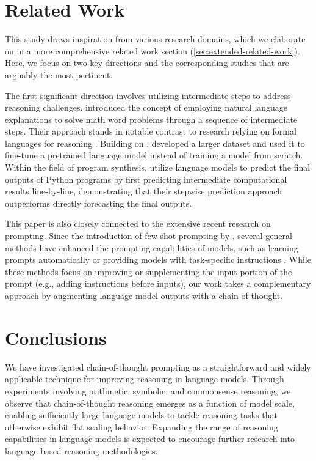 \section{Related Work} This study draws inspiration from various research domains, which we elaborate on in a more comprehensive related work section (\cref{sec:extended-related-work}). Here, we focus on two key directions and the corresponding studies that are arguably the most pertinent.

The first significant direction involves utilizing intermediate steps to address reasoning challenges. \cite{ling-etal-2017-program} introduced the concept of employing natural language explanations to solve math word problems through a sequence of intermediate steps. Their approach stands in notable contrast to research relying on formal languages for reasoning \citep{roy-2016-reasoning, chiang-chen-2019-semantically, amini-etal-2019-mathqa, chen2019neural}. Building on \citet{ling-etal-2017-program}, \citet{cobbe2021training} developed a larger dataset and used it to fine-tune a pretrained language model instead of training a model from scratch. Within the field of program synthesis, \cite{nye2021show} utilize language models to predict the final outputs of Python programs by first predicting intermediate computational results line-by-line, demonstrating that their stepwise prediction approach outperforms directly forecasting the final outputs.

This paper is also closely connected to the extensive recent research on prompting. Since the introduction of few-shot prompting by \citet{brown2020language}, several general methods have enhanced the prompting capabilities of models, such as learning prompts automatically \citep{lester-etal-2021-power} or providing models with task-specific instructions \citep{wei2021finetuned,sanh2021multitask,ouyang2022training}. While these methods focus on improving or supplementing the input portion of the prompt (e.g., adding instructions before inputs), our work takes a complementary approach by augmenting language model outputs with a chain of thought.

\section{Conclusions} We have investigated chain-of-thought prompting as a straightforward and widely applicable technique for improving reasoning in language models. Through experiments involving arithmetic, symbolic, and commonsense reasoning, we observe that chain-of-thought reasoning emerges as a function of model scale, enabling sufficiently large language models to tackle reasoning tasks that otherwise exhibit flat scaling behavior. Expanding the range of reasoning capabilities in language models is expected to encourage further research into language-based reasoning methodologies.

